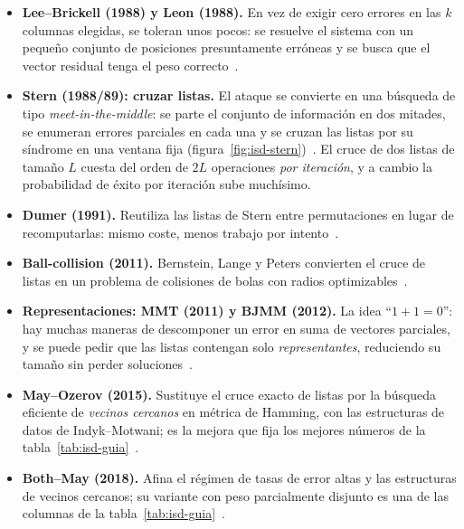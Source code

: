 \documentclass[11pt,a4paper,oneside]{report}
\begin{document}
\begin{itemize}[leftmargin=1.5em,itemsep=3pt]
  \item \textbf{Lee--Brickell (1988) y Leon (1988).}
        En vez de exigir cero errores en las $k$ columnas elegidas,
        se toleran unos pocos: se resuelve el sistema con un pequeño
        conjunto de posiciones presuntamente erróneas y se busca que
        el vector residual tenga el peso correcto~\cite{lee1988,leon1988}.
  \item \textbf{Stern (1988/89): cruzar listas.} El ataque se
        convierte en una búsqueda de tipo \emph{meet-in-the-middle}:
        se parte el conjunto de información en dos mitades, se
        enumeran errores parciales en cada una y se cruzan las listas
        por su síndrome en una ventana fija
        (figura~\ref{fig:isd-stern})~\cite{stern1989}. El cruce de
        dos listas de tamaño $L$ cuesta del orden de $2L$
        operaciones \emph{por iteración}, y a cambio la probabilidad de
        éxito por iteración sube muchísimo.
  \item \textbf{Dumer (1991).} Reutiliza las listas de Stern entre
        permutaciones en lugar de recomputarlas: mismo coste, menos
        trabajo por intento~\cite{dumer1991}.
  \item \textbf{Ball-collision (2011).} Bernstein, Lange y Peters
        convierten el cruce de listas en un problema de colisiones
        de bolas con radios optimizables~\cite{blp2011}.
  \item \textbf{Representaciones: MMT (2011) y BJMM (2012).} La
        idea ``$1+1=0$'': hay muchas maneras de descomponer un error
        en suma de vectores parciales, y se puede pedir que las
        listas contengan solo \emph{representantes}, reduciendo su
        tamaño sin perder soluciones~\cite{mmt2011,bjmm2012}.
  \item \textbf{May--Ozerov (2015).} Sustituye el cruce exacto de
        listas por la búsqueda eficiente de \emph{vecinos cercanos}
        en métrica de Hamming, con las estructuras de datos de
        Indyk--Motwani; es la mejora que fija los mejores números de
        la tabla~\ref{tab:isd-guia}~\cite{mo2015}.
  \item \textbf{Both--May (2018).} Afina el régimen de tasas de
        error altas y las estructuras de vecinos cercanos; su
        variante con peso parcialmente disjunto es una de las
        columnas de la tabla~\ref{tab:isd-guia}~\cite{bothmay2018}.
\end{itemize}
\end{document}
